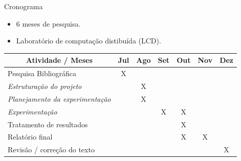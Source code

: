 \begin{frame}{Cronograma}
\begin{itemize}
		\item 6 meses de pesquisa.
		\item Laboratório de computação distibuída (LCD).
	\end{itemize}

	\begin{table}[]
        \centering
        \begin{tabular}{|l|c|c|c|c|c|c|}
        \hline
        \multicolumn{1}{|c|}{Atividade / Meses} & Jul & \multicolumn{1}{l|}{Ago} & \multicolumn{1}{l|}{Set} & \multicolumn{1}{l|}{Out} & \multicolumn{1}{l|}{Nov} & \multicolumn{1}{l|}{Dez} \\ \hline
        Pesquisa Bibliográfica                  & X     &                             &                               &                              &                               &                               \\ \hline
        \textit{Estruturação do projeto}        &       & X                           &                               &                              &                               &                               \\ \hline
        \textit{Planejamento da experimentação} &       & X                           &                               &                              &                               &                               \\ \hline
        \textit{Experimentação}                 &       &                             & X                             & X                            &                               &                               \\ \hline
        Tratamento de resultados                &       &                             &                               & X                            &                               &                               \\ \hline
        Relatório final                         &       &                             &                               & X                            & X                             &                               \\ \hline
        Revisão / correção do texto             &       &                             &                               &                              &                               & X                             \\ \hline
        \end{tabular}
        \label{table: Cronograma de pesquisa}
    \end{table}
\end{frame}

